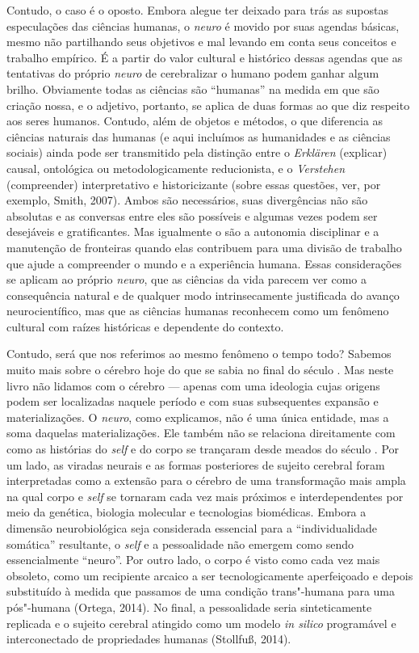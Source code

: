 Contudo, o caso é o oposto. Embora alegue ter deixado para trás as
supostas especulações das ciências humanas, o \emph{neuro} é movido por
suas agendas básicas, mesmo não partilhando seus objetivos e mal levando
em conta seus conceitos e trabalho empírico. É a partir do valor
cultural e histórico dessas agendas que as tentativas do próprio
\emph{neuro} de cerebralizar o humano podem ganhar algum brilho.
Obviamente todas as ciências são ``humanas'' na medida em que são
criação nossa, e o adjetivo, portanto, se aplica de duas formas ao que
diz respeito aos seres humanos. Contudo, além de objetos e métodos, o
que diferencia as ciências naturais das humanas (e aqui incluímos as
humanidades e as ciências sociais) ainda pode ser transmitido pela
distinção entre o \emph{Erklären} (explicar) causal, ontológica ou
metodologicamente reducionista, e o \emph{Verstehen} (compreender)
interpretativo e historicizante (sobre essas questões, ver, por exemplo,
Smith, 2007). Ambos são necessários, suas divergências não são absolutas
e as conversas entre eles são possíveis e algumas vezes podem ser
desejáveis e gratificantes. Mas igualmente o são a autonomia disciplinar e
a manutenção de fronteiras quando elas contribuem para uma divisão de
trabalho que ajude a compreender o mundo e a experiência humana. Essas
considerações se aplicam ao próprio \emph{neuro}, que as ciências da
vida parecem ver como a consequência natural e de qualquer modo
intrinsecamente justificada do avanço neurocientífico, mas que as
ciências humanas reconhecem como um fenômeno cultural com raízes
históricas e dependente do contexto.

Contudo, será que nos referimos ao mesmo fenômeno o tempo todo? Sabemos
muito mais sobre o cérebro hoje do que se sabia no final do século .
Mas neste livro não lidamos com o cérebro --- apenas com uma ideologia
cujas origens podem ser localizadas naquele período e com suas
subsequentes expansão e materializações. O \emph{neuro}, como
explicamos, não é uma única entidade, mas a soma daquelas
materializações. Ele também não se relaciona direitamente com como as
histórias do \emph{self} e do corpo se trançaram desde meados do século . Por
um lado, as viradas neurais e as formas posteriores de sujeito cerebral
foram interpretadas como a extensão para o cérebro de uma transformação
mais ampla na qual corpo e \emph{self} se tornaram cada vez mais próximos e
interdependentes por meio da genética, biologia molecular e tecnologias
biomédicas. Embora a dimensão neurobiológica seja considerada essencial
para a ``individualidade somática'' resultante, o \emph{self} e a pessoalidade
não emergem como sendo essencialmente ``neuro''. Por outro lado, o corpo
é visto como cada vez mais obsoleto, como um recipiente arcaico a ser
tecnologicamente aperfeiçoado e depois substituído à medida que passamos
de uma condição trans"-humana para uma pós"-humana (Ortega, 2014). No
final, a pessoalidade seria sinteticamente replicada e o sujeito cerebral
atingido como um modelo \emph{in silico} programável e interconectado de
propriedades humanas (Stollfuß, 2014).

